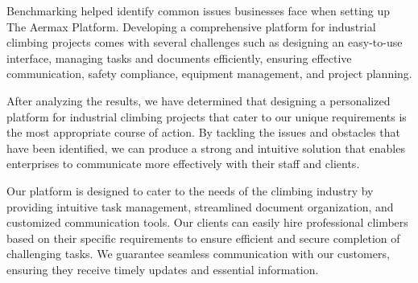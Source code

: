 Benchmarking helped identify common issues businesses face when setting up The Aermax Platform.
Developing a comprehensive platform for industrial climbing projects comes with several challenges such as designing an easy-to-use interface, managing tasks and documents efficiently, ensuring effective communication, safety compliance, equipment management, and project planning.
 

After analyzing the results, we have determined that designing a personalized platform for industrial climbing projects that cater to our unique requirements is the most appropriate course of action. By tackling the issues and obstacles that have been identified, we can produce a strong and intuitive solution that enables enterprises to communicate more effectively with their staff and clients.

Our platform is designed to cater to the needs of the climbing industry by providing intuitive task management, streamlined document organization, and customized communication tools. Our clients can easily hire professional climbers based on their specific requirements to ensure efficient and secure completion of challenging tasks. We guarantee seamless communication with our customers, ensuring they receive timely updates and essential information.


